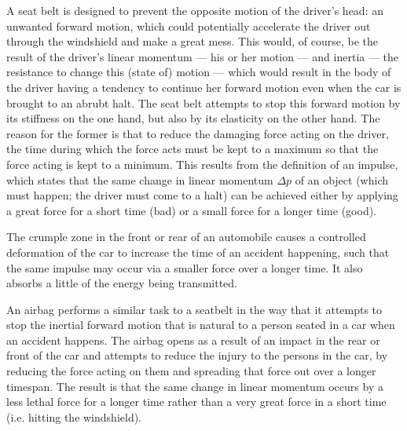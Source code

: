 
A seat belt is designed to prevent the opposite motion of the driver's head: an unwanted forward motion, which could potentially accelerate the driver out through the windshield and make a great mess. This would, of course, be the result of the driver's linear momentum --- his or her motion --- and inertia --- the resistance to change this (state of) motion --- which would result in the body of the driver having a tendency to continue her forward motion even when the car is brought to an abrubt halt. The seat belt attempts to stop this forward motion by its stiffness on the one hand, but also by its elasticity on the other hand. The reason for the former is that to reduce the damaging force acting on the driver, the time during which the force acts must be kept to a maximum so that the force acting is kept to a minimum. This results from the definition of an impulse, which states that the same change in linear momentum $\Delta p$ of an object (which must happen; the driver must come to a halt) can be achieved either by applying a great force for a short time (bad) or a small force for a longer time (good).


The crumple zone in the front or rear of an automobile causes a controlled deformation of the car to increase the time of an accident happening, such that the same impulse may occur via a smaller force over a longer time. It also absorbs a little of the energy being transmitted.


An airbag performs a similar task to a seatbelt in the way that it attempts to stop the inertial forward motion that is natural to a person seated in a car when an accident happens. The airbag opens as a result of an impact in the rear or front of the car and attempts to reduce the injury to the persons in the car, by reducing the force acting on them and spreading that force out over a longer timespan. The result is that the same change in linear momentum occurs by a less lethal force for a longer time rather than a very great force in a short time (i.e. hitting the windshield). 


